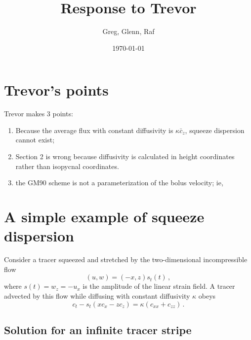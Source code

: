 \documentclass[11pt, oneside]{article}
\newcommand{\com}		{\, ,}
\newcommand{\per}		{\, .}
\newcommand{\beq}		{\begin{equation}}
\newcommand{\eeq}		{\end{equation}}
\begin{document}
\title{ \vspace{-6ex}
%
Response to Trevor
%
\vspace{-0.6ex} }

\author{Greg, Glenn, Raf} 

\date{\today} 

\vspace{-0.6ex} \maketitle \vspace{-4ex}

\section{Trevor's points}

Trevor makes 3 points:
\begin{enumerate}
\item Because the average flux with constant diffusivity is $\kappa \bar c_z$, squeeze dispersion cannot exist;
\item Section 2 is wrong because diffusivity is calculated in height coordinates rather than isopycnal coordinates.
\item the GM90 scheme is not a parameterization of the bolus velocity; ie, 
\end{enumerate}

\section{A simple example of squeeze dispersion}

Consider a tracer squeezed and stretched by the two-dimensional incompressible flow
\beq
(u, w) = \left ( -x, z \right ) s_t(t) \com
\eeq
where $s(t) = w_z = -u_x$ is the amplitude of the linear strain field. 
A tracer advected by this flow while diffusing with constant diffusivity $\kappa$ obeys
\beq
c_t -  s_t \left ( x c_x - z c_z \right ) = \kappa \left ( c_{xx} + c_{zz} \right ) \per
\label{tracereqn}
\eeq

\subsection{Solution for an infinite tracer stripe}
\newcommand{\tz}{\tilde z}
\renewcommand{\tt}{\tilde t}
\end{document}
